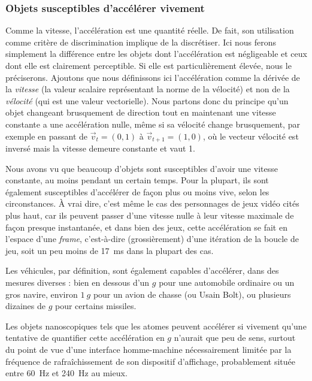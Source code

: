 	\FloatBarrier \subsubsection{Objets susceptibles d'accélérer vivement}
	Comme la vitesse, l'accélération est une quantité réelle. De fait, son utilisation comme critère de discrimination implique de la discrétiser. Ici nous ferons simplement la différence entre les objets dont l'accélération est négligeable et ceux dont elle est clairement perceptible. Si elle est particulièrement élevée, nous le préciserons. Ajoutons que nous définissons ici l'accélération comme la dérivée de la \emph{vitesse} (la valeur scalaire représentant la norme de la vélocité) et non de la \emph{vélocité} (qui est une valeur vectorielle). Nous partons donc du principe qu'un objet changeant brusquement de direction tout en maintenant une vitesse constante a une \og accélération \fg{} nulle, même si sa vélocité change brusquement, par exemple en passant de $\vec{v}_{t} = (0,1)$ à $\vec{v}_{t+1} = (1,0)$, où le vecteur vélocité est inversé mais la vitesse demeure constante et vaut 1.
	
	Nous avons vu que beaucoup d'objets sont susceptibles d'avoir une vitesse constante, au moins pendant un certain temps. Pour la plupart, ils sont également susceptibles d'accélérer de façon plus ou moins vive, selon les circonstances. À vrai dire, c'est même le cas des personnages de jeux vidéo cités plus haut, car ils peuvent passer d'une vitesse nulle à leur vitesse maximale de façon presque instantanée, et dans bien des jeux, cette accélération se fait en l'espace d'une \emph{frame}, c'est-à-dire (grossièrement) d'une itération de la boucle de jeu, soit un peu moins de 17~ms dans la plupart des cas.
	
	Les véhicules, par définition, sont également capables d'accélérer, dans des mesures diverses : bien en dessous d'un $g$ pour une automobile ordinaire ou un gros navire, environ $1~g$ pour un avion de chasse (ou Usain Bolt\footnotemark{}), ou plusieurs dizaines de $g$ pour certains missiles\footnotemark{}.
	
	\addtocounter{footnote}{-1}
	\addtocounter{footnote}{1}
	
	Les objets nanoscopiques tels que les atomes peuvent accélérer si vivement qu'une tentative de quantifier cette accélération en $g$ n'aurait que peu de sens, surtout du point de vue d'une interface homme-machine nécessairement limitée par la fréquence de rafraîchissement de son dispositif d'affichage, probablement située entre 60~Hz et 240~Hz au mieux\footnotemark{}.
	
